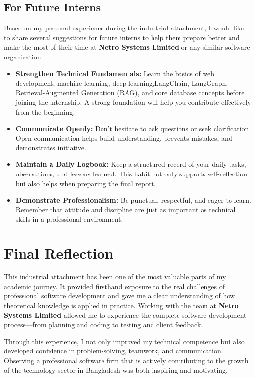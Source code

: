 \documentclass[12pt,a4paper]{report}
\newcommand{\company}[1]{\textcolor{companycolor}{\textbf{#1}}}
\newenvironment{coloritemize}
{\begin{itemize}[label=\textcolor{primaryblue}{$\bullet$}]}
{\end{itemize}}
\begin{document}
\subsection{For Future Interns}
Based on my personal experience during the industrial attachment, I would like to share several suggestions for future interns to help them prepare better and make the most of their time at \company{Netro Systems Limited} or any similar software organization.

\begin{coloritemize}
    \item \textcolor{skillcolor}{\textbf{Strengthen Technical Fundamentals:}} Learn the basics of web development, machine learning, deep learning,LangChain, LangGraph, Retrieval-Augmented Generation (RAG), and core database concepts before joining the internship. A strong foundation will help you contribute effectively from the beginning.
    \item \textcolor{skillcolor}{\textbf{Communicate Openly:}} Don’t hesitate to ask questions or seek clarification. Open communication helps build understanding, prevents mistakes, and demonstrates initiative.
    \item \textcolor{skillcolor}{\textbf{Maintain a Daily Logbook:}} Keep a structured record of your daily tasks, observations, and lessons learned. This habit not only supports self-reflection but also helps when preparing the final report.
    \item \textcolor{skillcolor}{\textbf{Demonstrate Professionalism:}} Be punctual, respectful, and eager to learn. Remember that attitude and discipline are just as important as technical skills in a professional environment.
\end{coloritemize}

\newpage
\section{Final Reflection}
This industrial attachment has been one of the most valuable parts of my academic journey. It provided firsthand exposure to the real challenges of professional software development and gave me a clear understanding of how theoretical knowledge is applied in practice. Working with the team at \company{Netro Systems Limited} allowed me to experience the complete software development process—from planning and coding to testing and client feedback.

Through this experience, I not only improved my technical competence but also developed confidence in problem-solving, teamwork, and communication. Observing a professional software firm that is actively contributing to the growth of the technology sector in Bangladesh was both inspiring and motivating. 
\end{document}
